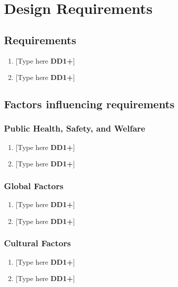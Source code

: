 \documentclass[letterpaper, 11pt]{article}
\begin{document}
\clearpage

\section{Design Requirements}
\subsection{Requirements}
\begin{enumerate}
    \item {[Type here \textbf{DD1+}]}
    \item {[Type here \textbf{DD1+}]}
\end{enumerate}

\clearpage

\subsection{Factors influencing requirements}
\subsubsection{Public Health, Safety, and Welfare}
\begin{enumerate}
    \item {[Type here \textbf{DD1+}]}
    \item {[Type here \textbf{DD1+}]}
\end{enumerate}

\subsubsection{Global Factors}
\begin{enumerate}
    \item {[Type here \textbf{DD1+}]}
    \item {[Type here \textbf{DD1+}]}
\end{enumerate}

\subsubsection{Cultural Factors}
\begin{enumerate}
    \item {[Type here \textbf{DD1+}]}
    \item {[Type here \textbf{DD1+}]}
\end{enumerate}
\end{document}
